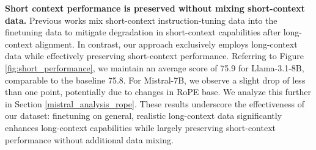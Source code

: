 \textbf{Short context performance is preserved without mixing short-context data.} Previous works \citep{an2024make, bai2024longalign, zhang2024longreward} mix short-context instruction-tuning data into the finetuning data to mitigate degradation in short-context capabilities after long-context alignment. 
In contrast, our approach exclusively employs long-context data while effectively preserving short-context performance. Referring to Figure \ref{fig:short_performance}, we maintain an average score of 75.9 for Llama-3.1-8B, comparable to the baseline 75.8. For Mistral-7B, we observe a slight drop of less than one point, potentially due to changes in RoPE base. We analyze this further in Section \ref{mistral_analysis_rope}.
These results underscore the effectiveness of our dataset: finetuning on general, realistic long-context data significantly enhances long-context capabilities while largely preserving short-context performance without additional data mixing.


